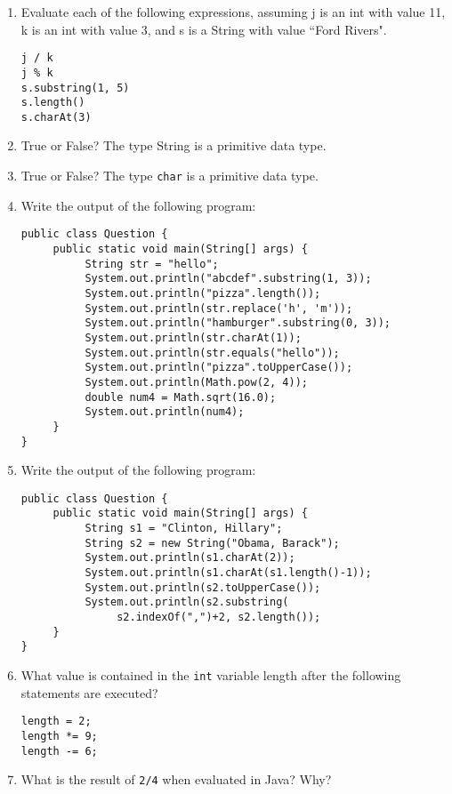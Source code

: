 \begin{enumerate}[label={\arabic{counter}\addtocounter{counter}{1}}.]
\item Evaluate each of the following expressions, assuming j is an int with value 11, k is an int with value 3, and s is a String with value ``Ford Rivers".
\begin{lstlisting}
j / k
j % k
s.substring(1, 5)
s.length()
s.charAt(3)
\end{lstlisting}

\item True or False? The type String is a primitive data type.

\item True or False? The type \verb|char| is a primitive data type.

\item Write the output of the following program:
\begin{lstlisting}
public class Question {
     public static void main(String[] args) {
          String str = "hello";
          System.out.println("abcdef".substring(1, 3));
          System.out.println("pizza".length());
          System.out.println(str.replace('h', 'm'));
          System.out.println("hamburger".substring(0, 3));
          System.out.println(str.charAt(1));
          System.out.println(str.equals("hello"));
          System.out.println("pizza".toUpperCase());
          System.out.println(Math.pow(2, 4));
          double num4 = Math.sqrt(16.0);
          System.out.println(num4);
     }
}
\end{lstlisting}

\item Write the output of the following program:
\begin{lstlisting}
public class Question {
     public static void main(String[] args) {
          String s1 = "Clinton, Hillary";
          String s2 = new String("Obama, Barack");
          System.out.println(s1.charAt(2));
          System.out.println(s1.charAt(s1.length()-1));
          System.out.println(s2.toUpperCase());
          System.out.println(s2.substring(
               s2.indexOf(",")+2, s2.length());
     }
}
\end{lstlisting}

\item What value is contained in the \verb|int| variable length after the following statements are executed?
\begin{lstlisting}
length = 2;
length *= 9;
length -= 6;
\end{lstlisting}

\item What is the result of \verb|2/4| when evaluated in Java? Why?

\end{enumerate}

